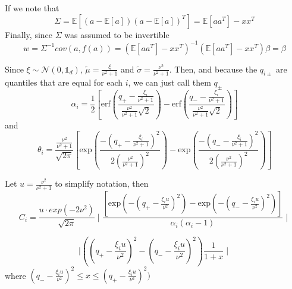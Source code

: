         If we note that 
        \begin{equation*}
            \Sigma = \mathds{E}[(a-\mathds{E}[a])(a-\mathds{E}[a])^T] = \mathds{E}[aa^T] - xx^T
        \end{equation*}
        Finally, since $\Sigma$ was assumed to be invertible 
        \begin{equation}
            w = \Sigma^{-1}cov(a,f(a)) = (\mathds{E}[aa^T] - xx^T)^{-1}(\mathds{E}[aa^T]-xx^T)\beta = \beta
        \end{equation}
        

        Since $\xi \sim \mathcal{N}(0,\mathds{1}_d)$, $\tilde{\mu} = \frac{\xi}{\nu^2+1}$ and $\tilde{\sigma} = \frac{\nu^2}{\nu^2+1}$. Then, and because the $q_{i\pm}$ are quantiles that are equal for each $i$, we can just call them $q_{\pm}$%
        \begin{equation*}
            \alpha_i = \frac{1}{2}\left[\text{erf} \left( \frac{q_{+}-\frac{\xi_i}{\nu^2+1}}{\frac{\nu^2}{\nu^2+1}\sqrt{2}} \right) - \text{erf} \left( \frac{q_{-}-\frac{\xi_i}{\nu^2+1}}{\frac{\nu^2}{\nu^2+1}\sqrt{2}} \right) \right]
        \end{equation*}
        and
        \begin{equation*}
            \theta_i = \frac{\frac{\nu^2}{\nu^2+1}}{\sqrt{2\pi}}\left[\text{exp}\left(\frac{-(q_+ -\frac{\xi_i}{\nu^2+1})^2}{2(\frac{\nu^2}{\nu^2+1})^2}\right) - \text{exp}\left(\frac{-(q_- -\frac{\xi_i}{\nu^2+1})^2}{2(\frac{\nu^2}{\nu^2+1})^2}\right)\right]
        \end{equation*}

        Let $u = \frac{\nu^2}{\nu^2+1}$ to simplify notation, then
        \begin{equation*}
            C_i = \frac{u\cdot exp(-2\nu^2)}{\sqrt{2\pi}}\mid \frac{\left[\text{exp}\left(-(q_+-\frac{\xi_i u}{\nu^2})^2\right) - \text{exp}\left(-(q_- -\frac{\xi_i u}{\nu^2})^2\right)\right]}{\alpha_i(\alpha_i-1)} \mid
        \end{equation*}

        
        \begin{equation*}
            \mid ((q_+-\frac{\xi_i u}{\nu^2})^2 - (q_--\frac{\xi_i u}{\nu^2})^2) \frac{1}{1 + x} \mid
        \end{equation*}
        where $(q_--\frac{\xi_i u}{\nu^2})^2 \leq x \leq (q_+-\frac{\xi_i u}{\nu^2})^2)$

